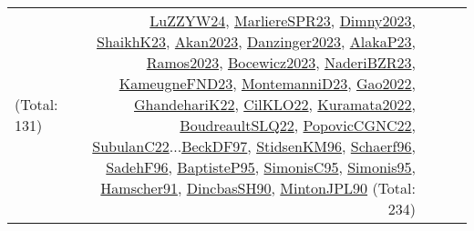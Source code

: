 {\begin{longtable}{p{3cm}r>{\raggedright\arraybackslash}p{6cm}>{\raggedright\arraybackslash}p{6cm}>{\raggedright\arraybackslash}p{8cm}}
(Total: 131) & \hyperref[detail:LuZZYW24]{LuZZYW24}, \hyperref[detail:MarliereSPR23]{MarliereSPR23}, \hyperref[detail:Dimny2023]{Dimny2023}, \hyperref[detail:ShaikhK23]{ShaikhK23}, \hyperref[detail:Akan2023]{Akan2023}, \hyperref[detail:Danzinger2023]{Danzinger2023}, \hyperref[detail:AlakaP23]{AlakaP23}, \hyperref[detail:Ramos2023]{Ramos2023}, \hyperref[detail:Bocewicz2023]{Bocewicz2023}, \hyperref[detail:NaderiBZR23]{NaderiBZR23}, \hyperref[detail:KameugneFND23]{KameugneFND23}, \hyperref[detail:MontemanniD23]{MontemanniD23}, \hyperref[detail:Gao2022]{Gao2022}, \hyperref[detail:GhandehariK22]{GhandehariK22}, \hyperref[detail:CilKLO22]{CilKLO22}, \hyperref[detail:Kuramata2022]{Kuramata2022}, \hyperref[detail:BoudreaultSLQ22]{BoudreaultSLQ22}, \hyperref[detail:PopovicCGNC22]{PopovicCGNC22}, \hyperref[detail:SubulanC22]{SubulanC22}...\hyperref[detail:BeckDF97]{BeckDF97}, \hyperref[detail:StidsenKM96]{StidsenKM96}, \hyperref[detail:Schaerf96]{Schaerf96}, \hyperref[detail:SadehF96]{SadehF96}, \hyperref[detail:BaptisteP95]{BaptisteP95}, \hyperref[detail:SimonisC95]{SimonisC95}, \hyperref[detail:Simonis95]{Simonis95}, \hyperref[detail:Hamscher91]{Hamscher91}, \hyperref[detail:DincbasSH90]{DincbasSH90}, \hyperref[detail:MintonJPL90]{MintonJPL90} (Total: 234)\\

\end{longtable}}
